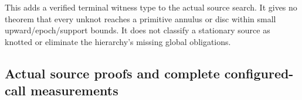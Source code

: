 This adds a verified terminal witness type to the actual source search.
It gives no theorem that every unknot reaches a primitive annulus or disc
within small upward/epoch/support bounds. It does not classify a stationary
source as knotted or eliminate the hierarchy's missing global obligations.

\subsection{Actual source proofs and complete configured-call measurements}

